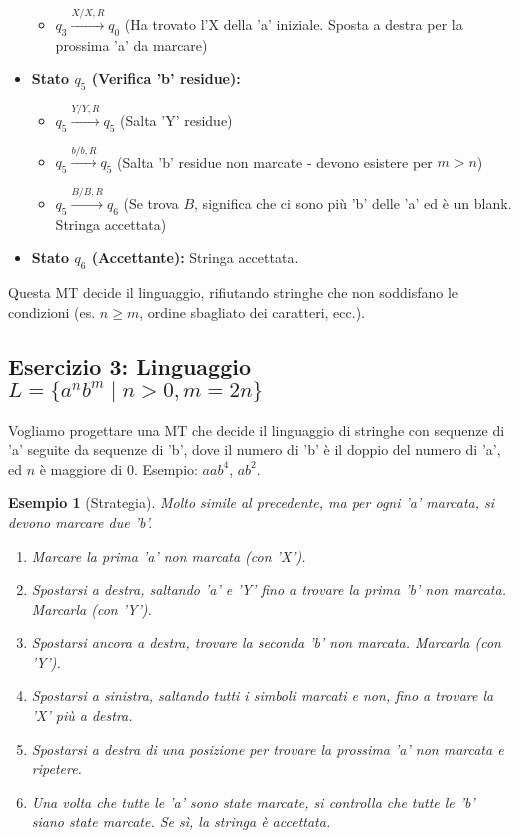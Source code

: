\documentclass[a4paper]{article}
\newtheorem{example}{Esempio}
\begin{document}
\begin{itemize}
\begin{itemize}
            \item $q_3 \xrightarrow{X / X, R} q_0$ (Ha trovato l'X della 'a' iniziale. Sposta a destra per la prossima 'a' da marcare)
        \end{itemize}
    \item \textbf{Stato $q_5$ (Verifica 'b' residue):}
        \begin{itemize}
            \item $q_5 \xrightarrow{Y / Y, R} q_5$ (Salta 'Y' residue)
            \item $q_5 \xrightarrow{b / b, R} q_5$ (Salta 'b' residue non marcate - devono esistere per $m>n$)
            \item $q_5 \xrightarrow{B / B, R} q_6$ (Se trova $B$, significa che ci sono più 'b' delle 'a' ed è un blank. Stringa accettata)
        \end{itemize}
    \item \textbf{Stato $q_6$ (Accettante):} Stringa accettata.
\end{itemize}
Questa MT decide il linguaggio, rifiutando stringhe che non soddisfano le condizioni (es. $n \ge m$, ordine sbagliato dei caratteri, ecc.).

\subsection{Esercizio 3: Linguaggio $L = \{a^n b^m \mid n > 0, m = 2n\}$}

Vogliamo progettare una MT che decide il linguaggio di stringhe con sequenze di 'a' seguite da sequenze di 'b', dove il numero di 'b' è il doppio del numero di 'a', ed $n$ è maggiore di $0$. Esempio: $aab^{4}$, $ab^{2}$.

\begin{example}[Strategia]
Molto simile al precedente, ma per ogni 'a' marcata, si devono marcare due 'b'.
\begin{enumerate}
    \item Marcare la prima 'a' non marcata (con 'X').
    \item Spostarsi a destra, saltando 'a' e 'Y' fino a trovare la prima 'b' non marcata. Marcarla (con 'Y').
    \item Spostarsi ancora a destra, trovare la seconda 'b' non marcata. Marcarla (con 'Y').
    \item Spostarsi a sinistra, saltando tutti i simboli marcati e non, fino a trovare la 'X' più a destra.
    \item Spostarsi a destra di una posizione per trovare la prossima 'a' non marcata e ripetere.
    \item Una volta che tutte le 'a' sono state marcate, si controlla che tutte le 'b' siano state marcate. Se sì, la stringa è accettata.
\end{enumerate}
\end{example}
\end{document}
